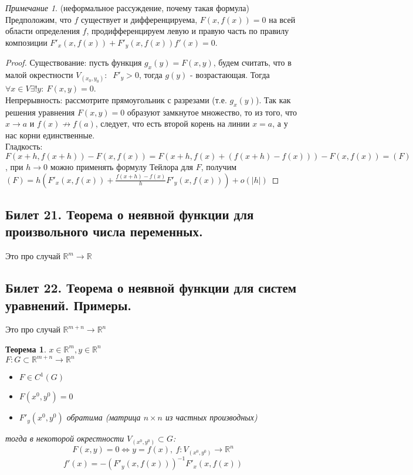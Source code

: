 \documentclass[a4paper]{article}
\theoremstyle{indented}
\newtheorem{theorem}{Теорема}
\theoremstyle{definition}
\theoremstyle{remark}
\newtheorem{remark}{Примечание}
\begin{document}
\begin{remark}
    (неформальное рассуждение, почему такая формула) Предположим, что $f$ существует и дифференцируема,
    $F(x,f(x))=0$ на всей области определения $f$, продифференцируем левую и правую часть по правилу композиции
    $F'_x(x,f(x))+F'_y(x,f(x)) f'(x)=0$.
\end{remark}

\begin{proof}
    Существование: пусть функция $g_x(y) = F(x,y)$, будем считать, что в малой окрестности $V_{(x_0,y_0)}: \ $ 
    $F'_y > 0$, тогда $g(y)$ - возрастающая. Тогда $\forall x \in V \exists ! y: \ F(x,y)=0$. \\
    Непрерывность: рассмотрите прямоугольник с разрезами (т.е. $g_x(y)$). Так как решения уравнения $F(x,y)=0$ образуют
    замкнутое множество, то из того, что $x \to a$ и $f(x) \not\to f(a)$, следует, что есть второй корень на линии $x=a$, а у 
    нас корни единственные. \\
    Гладкость: $F(x+h,f(x+h))-F(x,f(x))=F(x+h,f(x)+(f(x+h)-f(x)))-F(x,f(x))=(F)$, при $h\to 0$ можно применять формулу Тейлора 
    для $F$, получим $(F)=h(F'_x(x,f(x))+\frac{f(x+h)-f(x)}{h}F'_y(x,f(x)))+o(|h|)$
\end{proof}


\subsection{Билет 21. Теорема о неявной функции для произвольного числа переменных.}%


Это про случай $\mathbb{R}^m \to \mathbb{R}$


\subsection{Билет 22. Теорема о неявной функции для систем уравнений. Примеры.}%

Это про случай $\mathbb{R}^{m+n} \to \mathbb{R}^n$
\begin{theorem}
    $x\in \mathbb{R}^m , y \in \mathbb{R}^n$\\
    $F: G\subset\mathbb{R}^{m+n}\to \mathbb{R}^n$
    \begin{itemize}
        \item $F\in C^1(G)$
        \item $F(x^0,y^0)=0$
        \item $F'_y(x^0,y^0)$ обратима (матрица $n\times n$ из частных производных)
    \end{itemize}
    тогда в некоторой окрестности $V_{(x^0,y^0)} \subset G$: 
    $$F(x,y) = 0 \Leftrightarrow y=f(x), \ f: V_{(x^0,y^0)} \to \mathbb{R}^n$$
    $$f'(x) = -(F'_y(x,f(x)))^{-1} F'_x(x,f(x))$$
\end{theorem}
\end{document}
